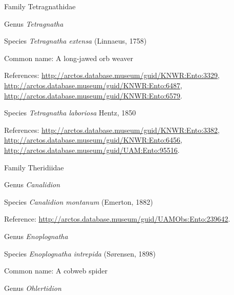 \documentclass[9pt, article]{memoir}
\begin{document}
\begin{multicols}{2}
\vspace{6pt}\noindent\hspace{24pt}Family Tetragnathidae


\vspace{6pt}\noindent\hspace{30pt}Genus \textit{Tetragnatha}


\vspace{6pt}\noindent\hspace{36pt}Species \textit{Tetragnatha extensa} (Linnaeus, 1758)


Common name: A long-jawed orb weaver

References: 
\url{http://arctos.database.museum/guid/KNWR:Ento:3329}, 
\url{http://arctos.database.museum/guid/KNWR:Ento:6487}, 
\url{http://arctos.database.museum/guid/KNWR:Ento:6579}.

\vspace{6pt}\noindent\hspace{36pt}Species \textit{Tetragnatha laboriosa} Hentz, 1850


References: 
\url{http://arctos.database.museum/guid/KNWR:Ento:3382}, 
\url{http://arctos.database.museum/guid/KNWR:Ento:6456}, 
\url{http://arctos.database.museum/guid/UAM:Ento:95516}.

\vspace{6pt}\noindent\hspace{24pt}Family Theridiidae


\vspace{6pt}\noindent\hspace{30pt}Genus \textit{Canalidion}


\vspace{6pt}\noindent\hspace{36pt}Species \textit{Canalidion montanum} (Emerton, 1882)


Reference: 
\url{http://arctos.database.museum/guid/UAMObs:Ento:239642}.

\vspace{6pt}\noindent\hspace{30pt}Genus \textit{Enoplognatha}


\vspace{6pt}\noindent\hspace{36pt}Species \textit{Enoplognatha intrepida} (Sørensen, 1898)


Common name: A cobweb spider

\vspace{6pt}\noindent\hspace{30pt}Genus \textit{Ohlertidion}



\end{multicols}
\end{document}
